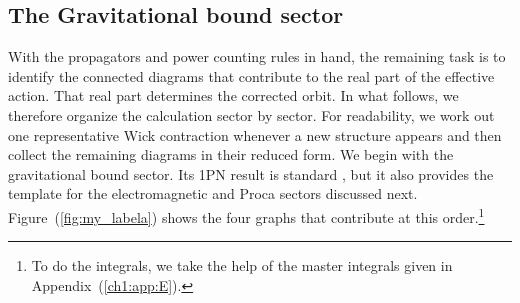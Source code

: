 \subsection{The Gravitational bound sector}
With the propagators and power counting rules in hand, the remaining task is to identify the connected diagrams that contribute to the real part of the effective action. That real part determines the corrected orbit. In what follows, we therefore organize the calculation sector by sector. For readability, we work out one representative Wick contraction whenever a new structure appears and then collect the remaining diagrams in their reduced form. We begin with the gravitational bound sector. Its 1PN result is standard \cite{Kuntz:2019zef}, but it also provides the template for the electromagnetic and Proca sectors discussed next. Figure~(\ref{fig:my_labela}) shows the four graphs that contribute at this order.\footnote{To do the integrals, we take the help of the master integrals given in Appendix~(\ref{ch1:app:E}).}
